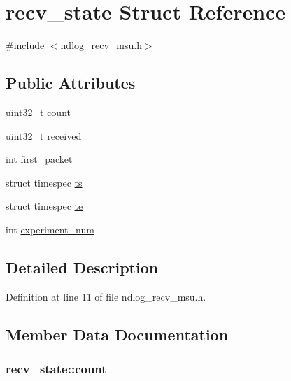 \hypertarget{structrecv__state}{\section{recv\-\_\-state Struct Reference}
\label{structrecv__state}
}


{\ttfamily \#include $<$ndlog\-\_\-recv\-\_\-msu.\-h$>$}

\subsection*{Public Attributes}
\begin{DoxyCompactItemize}
\item 
\hyperlink{msus_2webserver_2uthash_8h_a435d1572bf3f880d55459d9805097f62}{uint32\-\_\-t} \hyperlink{structrecv__state_aa75a943e8a8afd6aad261da73550f8fc}{count}
\item 
\hyperlink{msus_2webserver_2uthash_8h_a435d1572bf3f880d55459d9805097f62}{uint32\-\_\-t} \hyperlink{structrecv__state_ad846f5bdb59047e4064a5d1f84ea7e0a}{received}
\item 
int \hyperlink{structrecv__state_aaa4978ceb10d1540c7555bdbf1cd4d45}{first\-\_\-packet}
\item 
struct timespec \hyperlink{structrecv__state_aec1b8726e5167fb82a1b38624b3e81af}{ts}
\item 
struct timespec \hyperlink{structrecv__state_a88a57436666fe47d8f22261ec811ea16}{te}
\item 
int \hyperlink{structrecv__state_a914b921476b9dce11a70996b5282d2f8}{experiment\-\_\-num}
\end{DoxyCompactItemize}


\subsection{Detailed Description}


Definition at line 11 of file ndlog\-\_\-recv\-\_\-msu.\-h.



\subsection{Member Data Documentation}
\hypertarget{structrecv__state_aa75a943e8a8afd6aad261da73550f8fc}{
\subsubsection[{count}]{ recv\-\_\-state\-::count}}\label{structrecv__state_aa75a943e8a8afd6aad261da73550f8fc}


